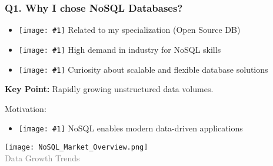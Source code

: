 \documentclass{beamer}
\newcommand{\icon}[1]{\texttt{[image: \#1]}}
\begin{document}
\begin{frame}[t]
\frametitle{Q1. Why I chose NoSQL Databases?}
\vspace{-0.3cm}
\begin{itemize}
    \item \icon{check-mark.png} Related to my specialization (Open Source DB)
    \item \icon{check-mark.png} High demand in industry for NoSQL skills
    \item \icon{check-mark.png} Curiosity about scalable and flexible database solutions
\end{itemize}
\vspace{0.1cm}
\textbf{Key Point:} Rapidly growing unstructured data volumes.
\begin{block}{Motivation:}
    \begin{itemize}
        \item \icon{check-mark.png} NoSQL enables modern data-driven applications
    \end{itemize}
\end{block}
\vspace{0.1cm}

\centering
\texttt{[image: NoSQL\_Market\_Overview.png]}\\
\scriptsize \textcolor{gray}{Data Growth Trends}
\end{frame}
\end{document}
